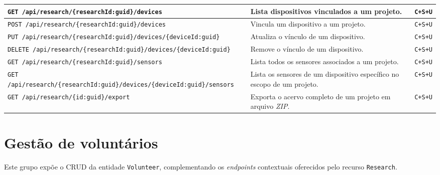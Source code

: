 \begin{longtable}{|p{}|p{}|p{}|}
\texttt{GET /api/research/\newline\{researchId:guid\}/devices} & Lista dispositivos vinculados a um projeto. & \texttt{C+S+U} \\ \hline
\texttt{POST /api/research/\newline\{researchId:guid\}/devices} & Vincula um dispositivo a um projeto. & \texttt{C+S+U} \\ \hline
\texttt{PUT /api/research/\newline\{researchId:guid\}/devices/\newline\{deviceId:guid\}} & Atualiza o vínculo de um dispositivo. & \texttt{C+S+U} \\ \hline
\texttt{DELETE /api/research/\newline\{researchId:guid\}/devices/\newline\{deviceId:guid\}} & Remove o vínculo de um dispositivo. & \texttt{C+S+U} \\ \hline
\texttt{GET /api/research/\newline\{researchId:guid\}/sensors} & Lista todos os sensores associados a um projeto. & \texttt{C+S+U} \\ \hline
\texttt{GET /api/research/\newline\{researchId:guid\}/devices/\newline\{deviceId:guid\}/sensors} & Lista os sensores de um dispositivo específico no escopo de um projeto. & \texttt{C+S+U} \\ \hline
\texttt{GET /api/research/\newline\{id:guid\}/export} & Exporta o acervo completo de um projeto em arquivo \textit{ZIP}. & \texttt{C+S+U} \\ \hline
\end{longtable}

\section{Gestão de voluntários}\label{sec:apendiceaVoluntarios}

Este grupo expõe o CRUD da entidade \texttt{Volunteer}, complementando os \textit{endpoints} contextuais oferecidos pelo recurso \texttt{Research}.

